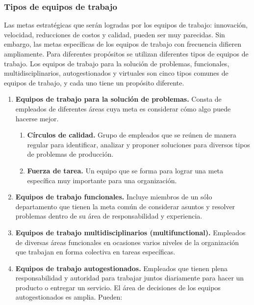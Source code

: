 \subsubsection{Tipos de equipos de trabajo}
Las metas estratégicas que serán logradas por los equipos de
trabajo: innovación, velocidad, reducciones de costos y calidad,
pueden ser muy parecidas. Sin embargo, las metas específicas de 
los equipos de trabajo con frecuencia difieren ampliamente. Para
diferentes propósitos se utilizan diferentes tipos de equipos de 
trabajo. Los equipos de trabajo para la solución de problemas,
funcionales, multidisciplinarios, autogestionados y virtuales son
cinco tipos comunes de equipos de trabajo, y cada uno tiene un
propósito diferente.

\begin{enumerate}
    \item \textbf{Equipos de trabajo para la solución de
    problemas.} Consta de empleados de diferentes áreas
    cuya meta es considerar cómo algo puede hacerse mejor.
    \begin{enumerate}
        \item \textbf{Círculos de calidad.} Grupo de
        empleados que se reúnen de manera regular para
        identificar, analizar y proponer soluciones para
        diversos tipos de problemas de producción.
        \item \textbf{Fuerza de tarea.} Un equipo que se
        forma para lograr una meta específica muy
        importante para una organización. 
    \end{enumerate}
    
    \item \textbf{Equipos de trabajo funcionales.}
    Incluye miembros de un sólo departamento que tienen la
    meta común de considerar asuntos y resolver problemas
    dentro de su área de responsabilidad y experiencia.
    
    \item \textbf{Equipos de trabajo multidisciplinarios
    (multifunctional).} Empleados de diversas áreas
    funcionales en ocasiones varios niveles de la
    organización que trabajan en forma colectiva en
    tareas específicas.
    
    \item \textbf{Equipos de trabajo autogestionados.}
    Empleados que tienen plena responsabilidad y autoridad
    para trabajar juntos diariamente para hacer un producto
    o entregar un servicio. El área de decisiones de los
    equipos autogestionados es amplia. Pueden:


\end{enumerate}
